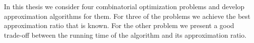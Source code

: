 In this thesis we consider four combinatorial optimization problems and develop approximation algorithms for them.
For three of the problems we achieve the best approximation ratio that is known.
For the other problem we present a good trade-off between the running time of the algorithm and its approximation ratio.

